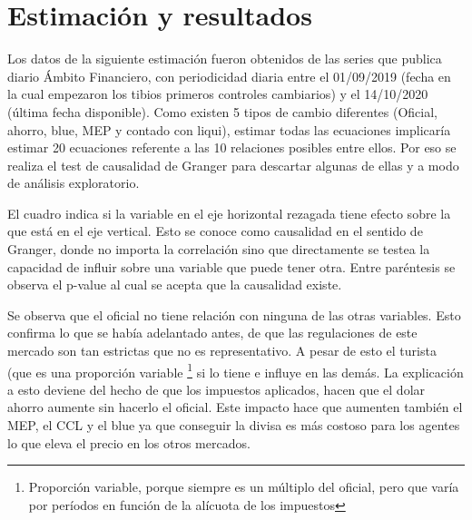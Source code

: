 \documentclass[11pt,a4paper]{article}
\begin{document}
\section{Estimación y resultados}
Los datos de la siguiente estimación fueron obtenidos de las series que publica diario Ámbito Financiero, con periodicidad diaria entre el 01/09/2019 (fecha en la cual empezaron los tibios primeros controles cambiarios) y el 14/10/2020 (última fecha disponible). Como existen 5 tipos de cambio diferentes (Oficial, ahorro, blue, MEP y contado con liqui), estimar todas las ecuaciones implicaría estimar 20 ecuaciones referente a las 10 relaciones posibles entre ellos. Por eso se realiza el test de causalidad de Granger para descartar algunas de ellas y a modo de análisis exploratorio.
\begin{table}[H]
\centering
{}
\caption{Tabla de causalidad de Granger(Horizontal causa y vertical consecuencia)}
\end{table}
El cuadro indica si la variable en el eje horizontal rezagada tiene efecto sobre la que está en el eje vertical. Esto se conoce como causalidad en el sentido de Granger, donde no importa la correlación sino que directamente se testea la capacidad de influir sobre una variable que puede tener otra. Entre paréntesis se observa el p-value al cual se acepta que la causalidad existe.

Se observa que el oficial no tiene relación con ninguna de las otras variables. Esto confirma lo que se había adelantado antes, de que las regulaciones de este mercado son tan estrictas que no es representativo. A pesar de esto el turista (que es una proporción variable \footnote{Proporción variable, porque siempre es un múltiplo del oficial, pero que varía por períodos en función de la alícuota de los impuestos} si lo tiene e influye en las demás. La explicación a esto deviene del hecho de que los impuestos aplicados, hacen que el dolar ahorro aumente sin hacerlo el oficial. Este impacto hace que aumenten también el MEP, el CCL y el blue ya que conseguir la divisa es más costoso para los agentes lo que eleva el precio en los otros mercados.
\end{document}
